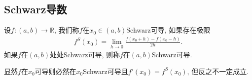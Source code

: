 \documentclass[../../main.tex]{subfiles}
\begin{document}
\subsection{Schwarz导数}

\begin{definition}[Schwarz导数]\label{definition:Schwarz导数}
设$f:(a,b) \to \mathbb{R}$, 我们称$f$在$x_0 \in (a,b)$Schwarz可导, 如果存在极限
\begin{align}
f^S(x_0) = \lim_{h \to 0} \frac{f(x_0 + h) - f(x_0 - h)}{2h}. \label{eq:13.2348982334242te3fd938523i23903t3ger34t4234898938523i23903t3ger34t4106}
\end{align}
如果$f$在$(a,b)$处处Schwarz可导, 则称$f$在$(a,b)$Schwarz可导.
\end{definition}
\begin{note}
显然$f$在$x_0$可导则必然在$x_0$Schwarz可导且$f'(x_0) = f^S(x_0)$, 但反之不一定成立.
\end{note}
\end{document}
